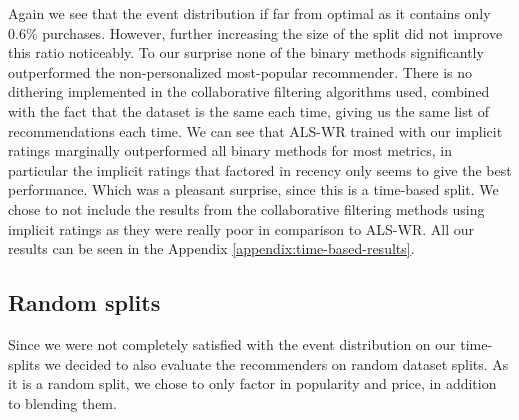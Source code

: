 Again we see that the event distribution if far from optimal as it contains only 0.6\% purchases. However, further increasing the size of the split did not improve this ratio noticeably.
To our surprise none of the binary methods significantly outperformed the non-personalized most-popular recommender.
There is no dithering implemented in the collaborative filtering algorithms used, combined with the fact that the dataset is the same each time, giving us the same list of
recommendations each time. We can see that ALS-WR trained with our implicit ratings marginally outperformed all binary methods for most metrics, in particular the implicit ratings that factored in recency only seems
to give the best performance. Which was a pleasant surprise, since this is a time-based split. We chose to not include the results from the collaborative filtering methods using implicit ratings as they were really
poor in comparison to ALS-WR. All our results can be seen in the Appendix \ref{appendix:time-based-results}.

\subsection{Random splits}

Since we were not completely satisfied with the event distribution on our time-splits we decided to also evaluate the recommenders on random dataset splits.
As it is a random split, we chose to only factor in popularity and price, in addition to blending them.

